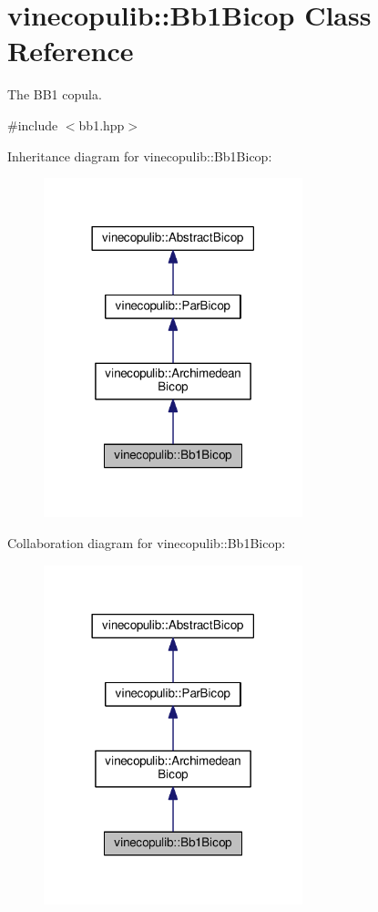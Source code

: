 \hypertarget{classvinecopulib_1_1_bb1_bicop}{}\section{vinecopulib\+:\+:Bb1\+Bicop Class Reference}
\label{classvinecopulib_1_1_bb1_bicop}


The B\+B1 copula.  




{\ttfamily \#include $<$bb1.\+hpp$>$}



Inheritance diagram for vinecopulib\+:\+:Bb1\+Bicop\+:\nopagebreak
\begin{figure}[H]
\begin{center}
\leavevmode
\includegraphics[width=213pt]{classvinecopulib_1_1_bb1_bicop__inherit__graph}
\end{center}
\end{figure}


Collaboration diagram for vinecopulib\+:\+:Bb1\+Bicop\+:\nopagebreak
\begin{figure}[H]
\begin{center}
\leavevmode
\includegraphics[width=213pt]{classvinecopulib_1_1_bb1_bicop__coll__graph}
\end{center}
\end{figure}
